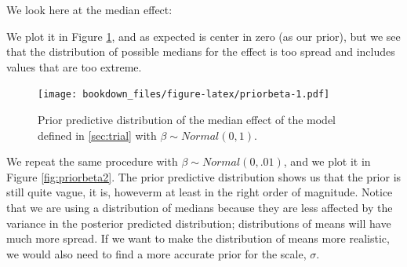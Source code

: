 \documentclass[12pt,]{krantz}
\newenvironment{Shaded}{\begin{snugshade}}{\end{snugshade}}
\newcommand{\DataTypeTok}[1]{\textcolor[rgb]{0.13,0.29,0.53}{#1}}
\newcommand{\KeywordTok}[1]{\textcolor[rgb]{0.13,0.29,0.53}{\textbf{#1}}}
\newcommand{\NormalTok}[1]{#1}
\newcommand{\OperatorTok}[1]{\textcolor[rgb]{0.81,0.36,0.00}{\textbf{#1}}}
\newcommand{\OtherTok}[1]{\textcolor[rgb]{0.56,0.35,0.01}{#1}}
\newcommand{\StringTok}[1]{\textcolor[rgb]{0.31,0.60,0.02}{#1}}
\theoremstyle{definition}
\theoremstyle{definition}
\theoremstyle{definition}
\theoremstyle{remark}
\begin{document}
We look here at the median effect:

\begin{Shaded}
\end{Shaded}

We plot it in Figure \ref{fig:priorbeta}, and as expected is center in zero (as our prior), but we see that the distribution of possible medians for the effect is too spread and includes values that are too extreme.



\begin{Shaded}
\end{Shaded}

\begin{figure}
\centering
\texttt{[image: bookdown\_files/figure-latex/priorbeta-1.pdf]}
\caption{\label{fig:priorbeta}Prior predictive distribution of the median effect of the model defined in \ref{sec:trial} with \(\beta \sim Normal(0, 1)\).}
\end{figure}

We repeat the same procedure with \(\beta \sim Normal(0,.01)\), and we plot it in Figure \ref{fig:priorbeta2}. The prior predictive distribution shows us that the prior is still quite vague, it is, howeverm at least in the right order of magnitude. Notice that we are using a distribution of medians because they are less affected by the variance in the posterior predicted distribution; distributions of means will have much more spread. If we want to make the distribution of means more realistic, we would also need to find a more accurate prior for the scale, \(\sigma\).
\end{document}
